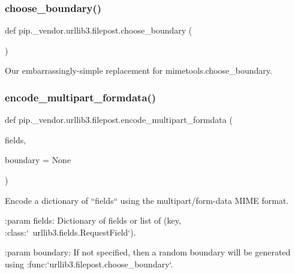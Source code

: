 \subsubsection{\texorpdfstring{choose\+\_\+boundary()}{choose\_boundary()}}
{\footnotesize\ttfamily def pip.\+\_\+vendor.\+urllib3.\+filepost.\+choose\+\_\+boundary (\begin{DoxyParamCaption}{ }\end{DoxyParamCaption})}

\begin{DoxyVerb}Our embarrassingly-simple replacement for mimetools.choose_boundary.
\end{DoxyVerb}
 \mbox{\label{namespacepip_1_1__vendor_1_1urllib3_1_1filepost_affadb40ac270d6fd2c5fe996e77b3ae1}} 
\subsubsection{\texorpdfstring{encode\+\_\+multipart\+\_\+formdata()}{encode\_multipart\_formdata()}}
{\footnotesize\ttfamily def pip.\+\_\+vendor.\+urllib3.\+filepost.\+encode\+\_\+multipart\+\_\+formdata (\begin{DoxyParamCaption}\item[{}]{fields,  }\item[{}]{boundary = {\ttfamily None} }\end{DoxyParamCaption})}

\begin{DoxyVerb}Encode a dictionary of ``fields`` using the multipart/form-data MIME format.

:param fields:
    Dictionary of fields or list of (key, :class:`~urllib3.fields.RequestField`).

:param boundary:
    If not specified, then a random boundary will be generated using
    :func:`urllib3.filepost.choose_boundary`.
\end{DoxyVerb}
 \mbox{\label{namespacepip_1_1__vendor_1_1urllib3_1_1filepost_aa6f4e168f51fa2c26102239a4136b09e}} 
